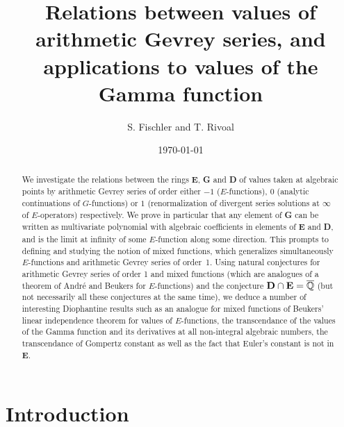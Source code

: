 \documentclass[reqno,12pt]{article}
\numberwithin{equation}{section}
\theoremstyle{remark}
\newcommand{\Qbar}{\overline{\mathbb Q}}
\begin{document}

\title{
Relations between values of arithmetic Gevrey series, 
and applications to values of the Gamma function
}
\date\today
\author{S. Fischler and T. Rivoal}
\maketitle

\begin{abstract} We investigate the relations between the rings {\bf E}, {\bf G} 
 and  {\bf D} 
of values taken at algebraic points by arithmetic Gevrey series of order either $-1$ ($E$-functions),  $0$ (analytic continuations of $G$-functions) or $1$ (renormalization of divergent series solutions at $\infty$ of $E$-operators) respectively.
We prove in particular that any element of {\bf  G} can be written as multivariate polynomial with algebraic coefficients in elements of {\bf E} and {\bf D}, and is the limit at infinity of some $E$-function along some direction. This prompts to defining and  studying the notion of mixed functions, which generalizes simultaneously $E$-functions and arithmetic Gevrey series of order~1. Using natural conjectures for arithmetic Gevrey series of order 1 and mixed functions (which are analogues of a theorem of Andr\'e and Beukers for $E$-functions) and the conjecture ${\bf D}\cap{\bf E}=\Qbar$ (but not necessarily all these conjectures at the same time), we deduce a number of interesting Diophantine results such as an analogue for mixed functions of Beukers' linear independence theorem for values of $E$-functions,  the transcendance of the values of the Gamma function and its derivatives at all non-integral algebraic numbers, the transcendance of Gompertz constant as well as the fact that Euler's constant is not in {\bf E}. 
\end{abstract}






\section{Introduction} \label{sec:intro}
\end{document}
